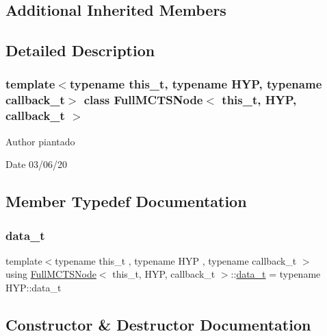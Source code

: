 \subsection*{Additional Inherited Members}


\subsection{Detailed Description}
\subsubsection*{template$<$typename this\+\_\+t, typename H\+YP, typename callback\+\_\+t$>$\newline
class Full\+M\+C\+T\+S\+Node$<$ this\+\_\+t, H\+Y\+P, callback\+\_\+t $>$}

\begin{DoxyAuthor}{Author}
piantado 
\end{DoxyAuthor}
\begin{DoxyDate}{Date}
03/06/20 
\end{DoxyDate}


\subsection{Member Typedef Documentation}
\mbox{\label{class_full_m_c_t_s_node_aeb23fb7cb05ca5e9af33a43054f79574}} 
\subsubsection{\texorpdfstring{data\+\_\+t}{data\_t}}
{\footnotesize\ttfamily template$<$typename this\+\_\+t , typename H\+YP , typename callback\+\_\+t $>$ \\
using \hyperlink{class_full_m_c_t_s_node}{Full\+M\+C\+T\+S\+Node}$<$ this\+\_\+t, H\+YP, callback\+\_\+t $>$\+::\hyperlink{class_full_m_c_t_s_node_aeb23fb7cb05ca5e9af33a43054f79574}{data\+\_\+t} =  typename H\+Y\+P\+::data\+\_\+t}



\subsection{Constructor \& Destructor Documentation}
\mbox{\label{class_full_m_c_t_s_node_a9604af49d0770347774d05307c744c70}} 
